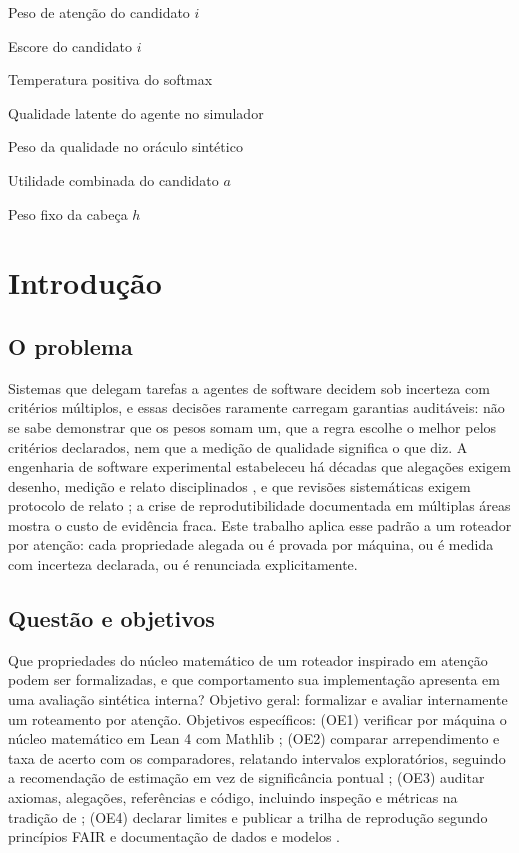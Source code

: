 \documentclass[12pt,openany,oneside,a4paper,brazil,chapter=TITLE]{abntex2}
\let\cite\citep
\begin{document}
\begin{simbolos}
\item[$w_i$] Peso de atenção do candidato $i$
\item[$f_i$] Escore do candidato $i$
\item[$\tau$] Temperatura positiva do softmax
\item[$q$] Qualidade latente do agente no simulador
\item[$q_w$] Peso da qualidade no oráculo sintético
\item[$u(a)$] Utilidade combinada do candidato $a$
\item[$\alpha_h$] Peso fixo da cabeça $h$
\end{simbolos}
\tableofcontents*
\clearpage
\textual
\pagestyle{abntsubmissao}
\hypersetup{pageanchor=true}

\chapter{Introdução}\label{cap:intro}
\section{O problema}
Sistemas que delegam tarefas a agentes de software decidem sob incerteza com critérios múltiplos, e essas decisões raramente carregam garantias auditáveis: não se sabe demonstrar que os pesos somam um, que a regra escolhe o melhor pelos critérios declarados, nem que a medição de qualidade significa o que diz. A engenharia de software experimental estabeleceu há décadas que alegações exigem desenho, medição e relato disciplinados \cite{basili1986,wohlin2012,runeson2009}, e que revisões sistemáticas exigem protocolo de relato \cite{page2021}; a crise de reprodutibilidade documentada em múltiplas áreas \cite{osc2015,ioannidis2005,collberg2016} mostra o custo de evidência fraca. Este trabalho aplica esse padrão a um roteador por atenção: cada propriedade alegada ou é provada por máquina, ou é medida com incerteza declarada, ou é renunciada explicitamente.
\section{Questão e objetivos}
Que propriedades do núcleo matemático de um roteador inspirado em atenção podem ser formalizadas, e que comportamento sua implementação apresenta em uma avaliação sintética interna? Objetivo geral: formalizar e avaliar internamente um roteamento por atenção. Objetivos específicos: (OE1) verificar por máquina o núcleo matemático em Lean 4 com Mathlib \cite{moura2021,mathlib2020}; (OE2) comparar arrependimento e taxa de acerto com os comparadores, relatando intervalos exploratórios, seguindo a recomendação de estimação em vez de significância pontual \cite{cumming2014,wasserstein2016}; (OE3) auditar axiomas, alegações, referências e código, incluindo inspeção e métricas na tradição de \cite{fagan1976,mccabe1976,chidamber1994}; (OE4) declarar limites e publicar a trilha de reprodução segundo princípios FAIR \cite{wilkinson2016} e documentação de dados e modelos \cite{gebru2021,mitchell2019}.
\end{document}
